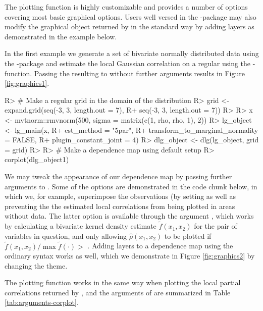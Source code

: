 The plotting function is highly customizable and provides a number of options covering most basic graphical options. Users well versed in the -package may also modify the graphical object returned by  in the standard way by adding layers as demonstrated in the example below.

In the first example we generate a set of bivariate normally distributed data using the -package \citep{gentz:etal:2018} and estimate the local Gaussian correlation on a regular  using the -function. Passing the resulting  to  without further arguments results in Figure \ref{fig:graphics1}.

\begin{example}
R> # Make a regular grid in the domain of the distribution
R> grid <- expand.grid(seq(-3, 3, length.out = 7),
R+                     seq(-3, 3, length.out = 7))
R> 
R> x <- mvtnorm::rmvnorm(500, sigma = matrix(c(1, rho, rho, 1), 2))
R> lg_object <- lg_main(x, 
R+                      est_method = "5par", 
R+                      transform_to_marginal_normality = FALSE,
R+                      plugin_constant_joint = 4)
R> dlg_object <- dlg(lg_object, grid = grid)
R> 
R> # Make a dependence map using default setup
R> corplot(dlg_object1)
\end{example}


We may tweak the appearance of our dependence map by passing further arguments to . Some of the options are demonstrated in the code chunk below, in which we, for example, superimpose the observations (by setting  as well as preventing the the estimated local correlations from being plotted in areas without data. The latter option is available through the argument , which works by calculating a bivariate kernel density estimate \(\tilde f(x_1, x_2)\) for the pair of  variables in question, and only allowing \(\widehat \rho(x_1,x_2)\) to be plotted if \(\tilde f(x_1,x_2)/\max\tilde f(\cdot) >\) . Adding layers to a dependence map using the ordinary  syntax works as well, which we demonstrate in Figure \ref{fig:graphics2} by changing the  theme.

The plotting function works in the same way when plotting the local partial correlations returned by , and the arguments of  are summarized in Table \ref{tab:arguments-corplot}.


